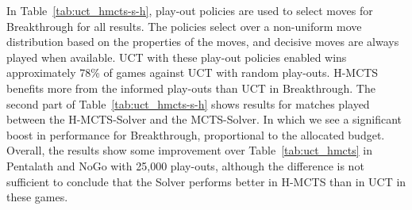\documentclass[a4paper]{llncs}
\begin{document}
\begin{table}[ht]
\centering
\tabcolsep=0.3cm
\vspace{4mm}
{\caption{H-MCTS vs. UCT with heuristic play-outs, with/without solver, 1,000 games} \label{tab:uct_hmcts-s-h}}
\end{table}

In Table~\ref{tab:uct_hmcts-s-h}, play-out policies are used to select moves for Breakthrough for all results. The policies select over a non-uniform move distribution based on the properties of the moves, and decisive moves are always played when available. UCT with these play-out policies enabled wins approximately 78\% of games against UCT with random play-outs. H-MCTS benefits more from the informed play-outs than UCT in Breakthrough. The second part of Table~\ref{tab:uct_hmcts-s-h} shows results for matches played between the H-MCTS-Solver and the MCTS-Solver. In which we see a significant boost in performance for Breakthrough, proportional to the allocated budget. Overall, the results show some improvement over Table~\ref{tab:uct_hmcts} in Pentalath and NoGo with 25,000 play-outs, although the difference is not sufficient to conclude that the Solver performs better in H-MCTS than in UCT in these games.
\end{document}
